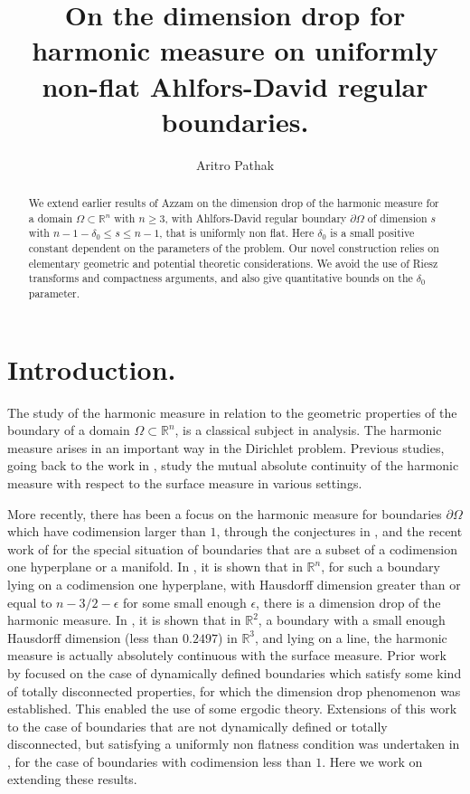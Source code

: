 \documentclass{article}
\title{On the dimension drop for harmonic measure on uniformly non-flat Ahlfors-David regular boundaries. }
\author{ Aritro Pathak}
\date{}
\newcounter{lem}
\newcounter{conj}
\theoremstyle{plain}
\theoremstyle{plain}
\newcommand{\R}{\mathbb{R}}
\newcommand{\eps}{\epsilon}
\theoremstyle{definition}
\theoremstyle{plain}
\begin{document}
\maketitle

\begin{abstract}
 We extend earlier results of Azzam on the dimension drop of the harmonic measure for a domain $\Omega\subset \R^{n}$ with $n\geq 3$, with Ahlfors-David regular boundary $\partial\Omega$ of dimension $s$ with $n-1-\delta_0 \leq s\leq n-1$, that is uniformly non flat. Here $\delta_0$ is a small positive constant dependent on the parameters of the problem. Our novel construction relies on elementary geometric and potential theoretic considerations. We avoid the use of Riesz transforms and compactness arguments, and also give quantitative bounds on the $\delta_0$ parameter.
\end{abstract}

\section{Introduction.}
 The study of the harmonic measure in relation to the geometric properties of the boundary of a domain $\Omega\subset \R^n$, is a classical subject in analysis. The harmonic measure arises in an important way in the Dirichlet problem. Previous studies, going back to the work in \cite{Rie23}, study the mutual absolute continuity of the harmonic measure with respect to the surface measure in various settings. 

  More recently, there has been a focus on the harmonic measure for boundaries $\partial\Omega$ which have codimension larger than $1$, through the conjectures in \cite{Vol22}, and the recent work of \cite{DJJ23, Tol24} for the special situation of boundaries that are a subset of a codimension one hyperplane or a manifold. In \cite{Tol24}, it is shown that in $\R^{n}$, for such a boundary lying on a codimension one hyperplane, with Hausdorff dimension greater than or equal to $n-3/2-\epsilon$ for some small enough $\eps$, there is a dimension drop of the harmonic measure. In \cite{DJJ23}, it is shown that in $\R^2$, a boundary with a small enough Hausdorff dimension (less than $0.2497$) in $\R^{3}$, and lying on a line, the harmonic measure is actually absolutely continuous with the surface measure.  
  Prior work by \cite{Car85, JW88, Vol93, Vol92, UZ02, Bat06, Bat00, Bat96} focused on the case of dynamically defined boundaries which satisfy some kind of totally disconnected properties, for which the dimension drop phenomenon was established. This enabled the use of some ergodic theory. Extensions of this work to the case of boundaries that are not dynamically defined or totally disconnected, but satisfying a uniformly non flatness condition was undertaken in \cite{Az20}, for the case of boundaries with codimension less than $1$. Here we work on extending these results.
\end{document}
